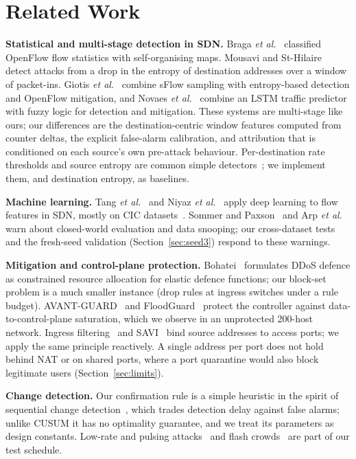 \documentclass[conference]{IEEEtran}
\begin{document}
\section{Related Work}
\textbf{Statistical and multi-stage detection in SDN.} Braga \emph{et al.}~\cite{braga2010lightweight} classified OpenFlow flow statistics with self-organising maps. Mousavi and St-Hilaire~\cite{mousavi2015early} detect attacks from a drop in the entropy of destination addresses over a window of packet-ins. Giotis \emph{et al.}~\cite{giotis2014combining} combine sFlow sampling with entropy-based detection and OpenFlow mitigation, and Novaes \emph{et al.}~\cite{novaes2020lstm} combine an LSTM traffic predictor with fuzzy logic for detection and mitigation. These systems are multi-stage like ours; our differences are the destination-centric window features computed from counter deltas, the explicit false-alarm calibration, and attribution that is conditioned on each source's own pre-attack behaviour. Per-destination rate thresholds and source entropy are common simple detectors~\cite{bawany2017ddos,yan2016sdn}; we implement them, and destination entropy, as baselines.

\textbf{Machine learning.} Tang \emph{et al.}~\cite{tang2016deep} and Niyaz \emph{et al.}~\cite{niyaz2017deep} apply deep learning to flow features in SDN, mostly on CIC datasets~\cite{sharafaldin2019ddos,sharafaldin2018toward}. Sommer and Paxson~\cite{sommer2010outside} and Arp \emph{et al.}~\cite{arp2022dos} warn about closed-world evaluation and data snooping; our cross-dataset tests and the fresh-seed validation (Section~\ref{sec:seed3}) respond to these warnings.

\textbf{Mitigation and control-plane protection.} Bohatei~\cite{fayaz2015bohatei} formulates DDoS defence as constrained resource allocation for elastic defence functions; our block-set problem is a much smaller instance (drop rules at ingress switches under a rule budget). AVANT-GUARD~\cite{shin2013avant} and FloodGuard~\cite{wang2015floodguard} protect the controller against data-to-control-plane saturation, which we observe in an unprotected 200-host network. Ingress filtering~\cite{rfc2827} and SAVI~\cite{rfc7039} bind source addresses to access ports; we apply the same principle reactively. A single address per port does not hold behind NAT or on shared ports, where a port quarantine would also block legitimate users (Section~\ref{sec:limits}).

\textbf{Change detection.} Our confirmation rule is a simple heuristic in the spirit of sequential change detection~\cite{page1954continuous,lorden1971procedures}, which trades detection delay against false alarms; unlike CUSUM it has no optimality guarantee, and we treat its parameters as design constants. Low-rate and pulsing attacks~\cite{kuzmanovic2003low} and flash crowds~\cite{jung2002flash} are part of our test schedule.
\end{document}
